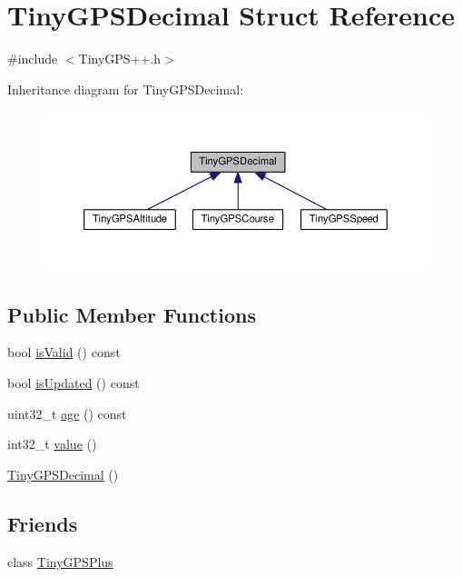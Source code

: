 \hypertarget{struct_tiny_g_p_s_decimal}{}\section{Tiny\+G\+P\+S\+Decimal Struct Reference}
\label{struct_tiny_g_p_s_decimal}


{\ttfamily \#include $<$Tiny\+G\+P\+S++.\+h$>$}



Inheritance diagram for Tiny\+G\+P\+S\+Decimal\+:\nopagebreak
\begin{figure}[H]
\begin{center}
\leavevmode
\includegraphics[width=350pt]{struct_tiny_g_p_s_decimal__inherit__graph}
\end{center}
\end{figure}
\subsection*{Public Member Functions}
\begin{DoxyCompactItemize}
\item 
bool \hyperlink{struct_tiny_g_p_s_decimal_a2a1d868525e903eb193b7a36cdd76984}{is\+Valid} () const 
\item 
bool \hyperlink{struct_tiny_g_p_s_decimal_ae8b7f9f7719c2974ebd3b34759493d15}{is\+Updated} () const 
\item 
uint32\+\_\+t \hyperlink{struct_tiny_g_p_s_decimal_ab80191a3e02c92ad3f674b5df2ab752f}{age} () const 
\item 
int32\+\_\+t \hyperlink{struct_tiny_g_p_s_decimal_ac3ce80976e5d8456e9f211b910a6cb19}{value} ()
\item 
\hyperlink{struct_tiny_g_p_s_decimal_ae09cbb1856cd57c7dcee52fb5fb1ba16}{Tiny\+G\+P\+S\+Decimal} ()
\end{DoxyCompactItemize}
\subsection*{Friends}
\begin{DoxyCompactItemize}
\item 
class \hyperlink{struct_tiny_g_p_s_decimal_a6501fd5ef19ae166d43e0e5781609ee2}{Tiny\+G\+P\+S\+Plus}
\end{DoxyCompactItemize}


